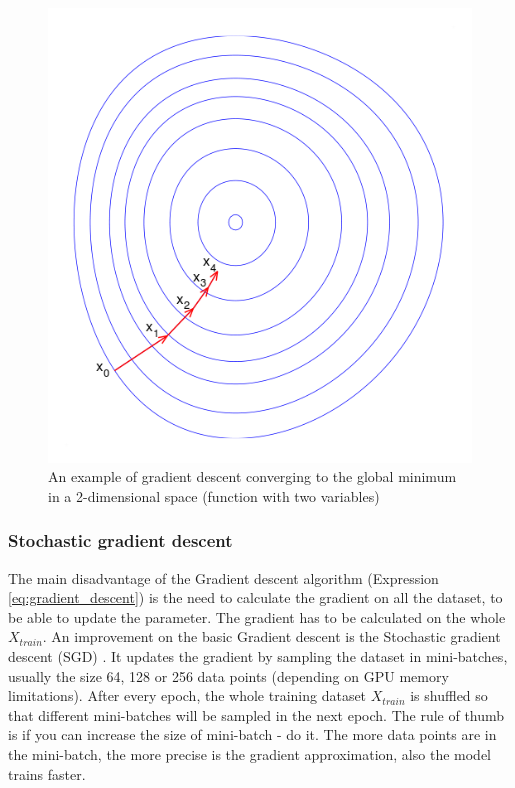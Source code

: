 \documentclass[times, utf8, diplomski]{fer}
\begin{document}
\begin{figure}
  \includegraphics[scale=0.5]{figures/gradient_descent.png}
  \centering
  \caption{An example of gradient descent converging to the global minimum in a 2-dimensional space (function with two variables)}
  \label{fig:local_and_global_function_values}
\end{figure}

\subsubsection{Stochastic gradient descent}
\label{se:stochastic_gd}

The main disadvantage of the Gradient descent algorithm (Expression \ref{eq:gradient_descent}) is the need to calculate the gradient on all the dataset, to be able to update the parameter. The gradient has to be calculated on the whole $X_{train}$. An improvement on the basic Gradient descent is the Stochastic gradient descent (SGD) \citep{bottou-98x}. It updates the gradient by sampling the dataset in mini-batches, usually the size 64, 128 or 256 data points (depending on GPU memory limitations). After every epoch, the whole training dataset $X_{train}$ is shuffled so that different mini-batches will be sampled in the next epoch. The rule of thumb is if you can increase the size of mini-batch - do it. The more data points are in the mini-batch, the more precise is the gradient approximation, also the model trains faster.
\end{document}

